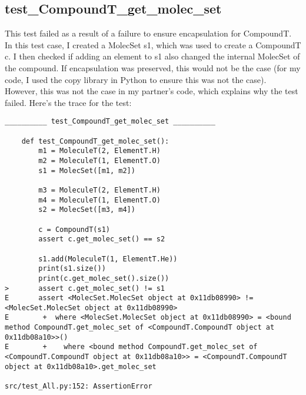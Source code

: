 \documentclass[12pt]{article}
\begin{document}
\subsection{test\_CompoundT\_get\_molec\_set}
This test failed as a result of a failure to ensure encapsulation for CompoundT. In this test case, I created a MolecSet s1, which was used to create a CompoundT c. I then checked if adding an element to s1 also changed the internal MolecSet of the compound. If encapsulation was preserved, this would not be the case (for my code, I used the copy library in Python to ensure this was not the case). However, this was not the case in my partner's code, which explains why the test failed. Here's the trace for the test:
\begin{lstlisting}
__________ test_CompoundT_get_molec_set __________

    def test_CompoundT_get_molec_set():
        m1 = MoleculeT(2, ElementT.H)
        m2 = MoleculeT(1, ElementT.O)
        s1 = MolecSet([m1, m2])

        m3 = MoleculeT(2, ElementT.H)
        m4 = MoleculeT(1, ElementT.O)
        s2 = MolecSet([m3, m4])

        c = CompoundT(s1)
        assert c.get_molec_set() == s2

        s1.add(MoleculeT(1, ElementT.He))
        print(s1.size())
        print(c.get_molec_set().size())
>       assert c.get_molec_set() != s1
E       assert <MolecSet.MolecSet object at 0x11db08990> != <MolecSet.MolecSet object at 0x11db08990>
E        +  where <MolecSet.MolecSet object at 0x11db08990> = <bound method CompoundT.get_molec_set of <CompoundT.CompoundT object at 0x11db08a10>>()
E        +    where <bound method CompoundT.get_molec_set of <CompoundT.CompoundT object at 0x11db08a10>> = <CompoundT.CompoundT object at 0x11db08a10>.get_molec_set

src/test_All.py:152: AssertionError
\end{lstlisting}


\clearpage
\end{document}

